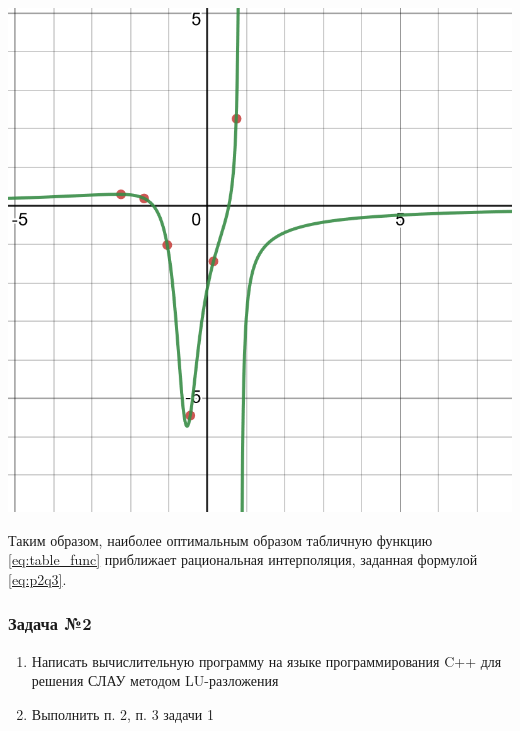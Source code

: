 \documentclass[a4paper, fontsize=14pt]{article}
\begin{document}
\begin{center}
    \label{p2q3}
    \includegraphics[scale=0.3]{src/p2q3}
\end{center}

Таким образом, наиболее оптимальным образом табличную функцию \eqref{eq:table_func} приближает рациональная интерполяция, заданная формулой \eqref{eq:p2q3}.

\subsubsection*{Задача №2}
\begin{enumerate}
    \item Написать вычислительную программу на языке программирования C++
          для решения СЛАУ методом LU-разложения
    \item Выполнить п. 2, п. 3 задачи 1
\end{enumerate}
\end{document}
